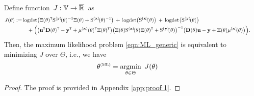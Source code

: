 \begin{proposition}\label{Pro:loglikelihood}
Define function 
$\, J:{\mathbb{V}}\to\overline{{\mathbb{R}}} \,$ 
as
\begin{equation}\label{eq:cost function ML}
    \begin{split}
    J({\vctheta}) :=&\,  
    \logdet\big(
        \Xitheta^\tr 
        \Sbfytheta^{-1} 
        \Xitheta 
        + 
        \Sbfxtheta^{-1}
    \big) 
    \, + \, 
    \logdet\big(\Sbfxtheta \big) 
    \, + \, 
    \logdet\big(\Sbfytheta \big)
     \\ &\quad
    +\Big(\big(\mathbf{u}^\tr 
    \mathbf{D}(\vctheta)^\tr 
    - \mathbf{y}^\tr + \mu^{(\mathbf{x})}({\vctheta})^\tr\Xi({\vctheta})^\tr\big)
    \big(\Xi({\vctheta})\Sbfxtheta \Xi({\vctheta})^\tr 
    + \Sbfytheta \big)^{-1}
    \big(\mathbf{D}(\vctheta) \mathbf{u} - \mathbf{y} + \Xi({\vctheta})\mubfxtheta \big)\Big). 
    \end{split}
\end{equation}
Then, the maximum likelihood problem %
\eqref{eqn:ML_generic}
is equivalent to minimizing $J$ over $\Theta$, i.e., we have
        \begin{equation}\label{eqn:min_J}
            \begin{split}
                \vcthetaML = \argminOp_{{\vctheta}\in\Theta} \ J({\vctheta}) 
            \end{split}
        \end{equation}
\end{proposition}
\begin{proof}
        The proof is provided in Appendix \ref{app:proof 1}.
\end{proof}

